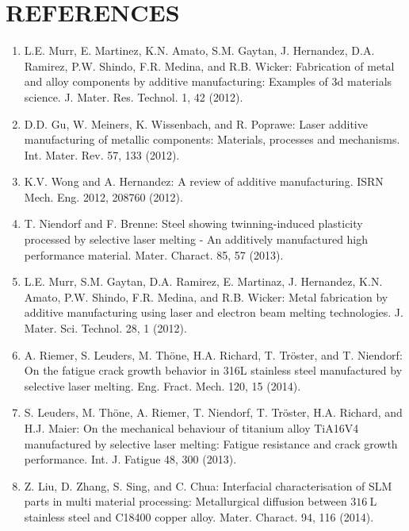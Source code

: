 \documentclass[10pt]{article}
\begin{document}
\section*{REFERENCES}
\begin{enumerate}
  \item L.E. Murr, E. Martinez, K.N. Amato, S.M. Gaytan, J. Hernandez, D.A. Ramirez, P.W. Shindo, F.R. Medina, and R.B. Wicker: Fabrication of metal and alloy components by additive manufacturing: Examples of 3d materials science. J. Mater. Res. Technol. 1, 42 (2012).

  \item D.D. Gu, W. Meiners, K. Wissenbach, and R. Poprawe: Laser additive manufacturing of metallic components: Materials, processes and mechanisms. Int. Mater. Rev. 57, 133 (2012).

  \item K.V. Wong and A. Hernandez: A review of additive manufacturing. ISRN Mech. Eng. 2012, 208760 (2012).

  \item T. Niendorf and F. Brenne: Steel showing twinning-induced plasticity processed by selective laser melting - An additively manufactured high performance material. Mater. Charact. 85, 57 (2013).

  \item L.E. Murr, S.M. Gaytan, D.A. Ramirez, E. Martinaz, J. Hernandez, K.N. Amato, P.W. Shindo, F.R. Medina, and R.B. Wicker: Metal fabrication by additive manufacturing using laser and electron beam melting technologies. J. Mater. Sci. Technol. 28, 1 (2012).

  \item A. Riemer, S. Leuders, M. Thöne, H.A. Richard, T. Tröster, and T. Niendorf: On the fatigue crack growth behavior in 316L stainless steel manufactured by selective laser melting. Eng. Fract. Mech. 120, 15 (2014).

  \item S. Leuders, M. Thöne, A. Riemer, T. Niendorf, T. Tröster, H.A. Richard, and H.J. Maier: On the mechanical behaviour of titanium alloy TiA16V4 manufactured by selective laser melting: Fatigue resistance and crack growth performance. Int. J. Fatigue 48, 300 (2013).

  \item Z. Liu, D. Zhang, S. Sing, and C. Chua: Interfacial characterisation of SLM parts in multi material processing: Metallurgical diffusion between $316 \mathrm{~L}$ stainless steel and C18400 copper alloy. Mater. Charact. 94, 116 (2014).


\end{enumerate}
\end{document}
